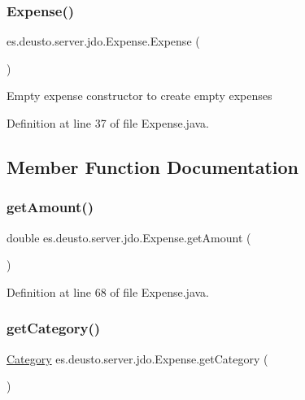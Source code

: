 \subsubsection{\texorpdfstring{Expense()}{Expense()}\hspace{0.1cm}{\footnotesize\ttfamily [2/2]}}
{\footnotesize\ttfamily es.\+deusto.\+server.\+jdo.\+Expense.\+Expense (\begin{DoxyParamCaption}{ }\end{DoxyParamCaption})}

Empty expense constructor to create empty expenses 

Definition at line 37 of file Expense.\+java.



\subsection{Member Function Documentation}
\mbox{\label{classes_1_1deusto_1_1server_1_1jdo_1_1_expense_ad877eb6362a3762e7943097000a46d9d}} 
\subsubsection{\texorpdfstring{get\+Amount()}{getAmount()}}
{\footnotesize\ttfamily double es.\+deusto.\+server.\+jdo.\+Expense.\+get\+Amount (\begin{DoxyParamCaption}{ }\end{DoxyParamCaption})}



Definition at line 68 of file Expense.\+java.

\mbox{\label{classes_1_1deusto_1_1server_1_1jdo_1_1_expense_a5fc577cffd2b708187c199ce2e8f0770}} 
\subsubsection{\texorpdfstring{get\+Category()}{getCategory()}}
{\footnotesize\ttfamily \hyperlink{enumes_1_1deusto_1_1server_1_1jdo_1_1_category}{Category} es.\+deusto.\+server.\+jdo.\+Expense.\+get\+Category (\begin{DoxyParamCaption}{ }\end{DoxyParamCaption})}



